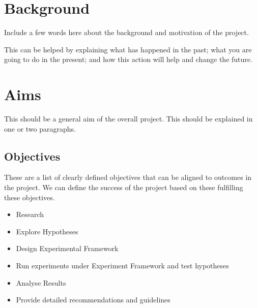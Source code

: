 \section{Background}
Include a few words here about the background and motivation of the project. 

This can be helped by explaining what has happened in the past; what you are going to do in the present; and how this action will help and change the future. 



\section{Aims}
This should be a general aim of the overall project. This should be explained in one or two paragraphs.

\subsection{Objectives}
These are a list of clearly defined objectives that can be aligned to outcomes in the project. We can define the success of the project based on these fulfilling these objectives.
\begin{itemize}
\item Research
\item Explore Hypotheses
\item Design Experimental Framework
\item Run experiments under Experiment Framework and test hypotheses
\item Analyse Results
\item Provide detailed recommendations and guidelines 
\end{itemize}


